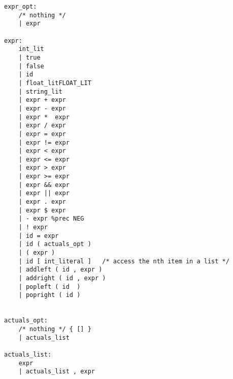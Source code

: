 \documentclass[./LRM_main.tex]{subfiles}
\begin{document}
\begin{lstlisting}
expr_opt:
    /* nothing */
    | expr       

expr:
    int_lit
    | true
    | false
    | id
    | float_litFLOAT_LIT     
    | string_lit
    | expr + expr
    | expr - expr            
    | expr *  expr           
    | expr / expr           
    | expr = expr           
    | expr != expr           
    | expr < expr           
    | expr <= expr           
    | expr > expr           
    | expr >= expr           
    | expr && expr           
    | expr || expr           
    | expr . expr           
    | expr $ expr           
    | - expr %prec NEG       
    | ! expr                   
    | id = expr             
    | id ( actuals_opt )
    | ( expr )          
    | id [ int_literal ]   /* access the nth item in a list */ 
    | addleft ( id , expr )  
    | addright ( id , expr ) 
    | popleft ( id  ) 
    | popright ( id ) 


actuals_opt:
    /* nothing */ { [] }
    | actuals_list

actuals_list:
    expr
    | actuals_list , expr
\end{lstlisting}
   
\end{document}
